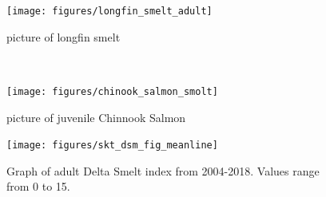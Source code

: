\documentclass[
]{book}
\begin{document}
\begin{panel-grid}
\begin{columns-nocenter}
\begin{column800}

\begin{figure}

{\centering \texttt{[image: figures/longfin\_smelt\_adult]} 

}

\caption{picture of longfin smelt}\label{fig:unnamed-chunk-180}
\end{figure}

\end{column800}

\begin{column40}

~

\end{column40}

\begin{column800}

\begin{figure}

{\centering \texttt{[image: figures/chinook\_salmon\_smolt]} 

}

\caption{picture of juvenile Chinnook Salmon}\label{fig:unnamed-chunk-181}
\end{figure}

\end{column800}

\end{columns-nocenter}

\begin{columns-nocenter}

\begin{column800}

\begin{expand}

\begin{figure}
\texttt{[image: figures/skt\_dsm\_fig\_meanline]} \caption{Graph of adult Delta Smelt index from 2004-2018. Values range from 0 to 15.}\label{fig:unnamed-chunk-182}
\end{figure}

\end{expand}

\end{column800}

\begin{column40}

~

\end{column40}

\begin{column800}


\end{column800}
\end{columns-nocenter}
\end{panel-grid}
\end{document}
